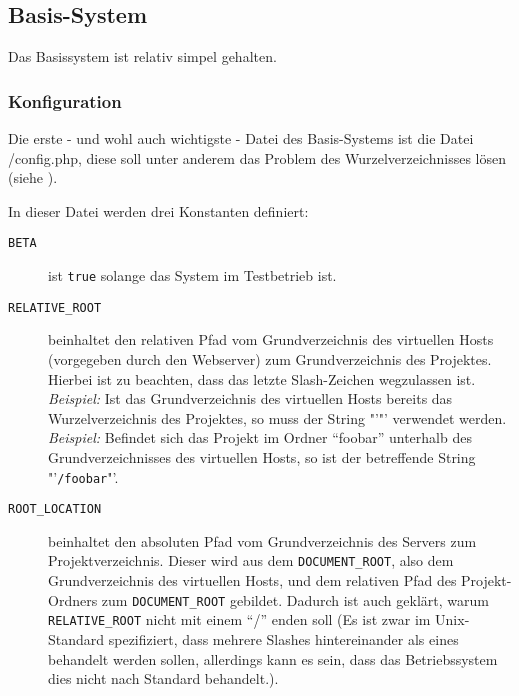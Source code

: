 \subsection{Basis-System}
Das Basissystem ist relativ simpel gehalten.\\
\subsubsection{Konfiguration}
Die erste - und wohl auch wichtigste - Datei des Basis-Systems ist die Datei /config.php, diese soll unter anderem das Problem des Wurzelverzeichnisses lösen (siehe ).

In dieser Datei werden drei Konstanten definiert:
\begin{description}
	\item[\texttt{BETA}] ist \texttt{true} solange das System im Testbetrieb ist.
	\item[\texttt{RELATIVE\_ROOT}] beinhaltet den relativen Pfad vom Grundverzeichnis des virtuellen Hosts (vorgegeben durch den Webserver) zum Grundverzeichnis des Projektes. Hierbei ist zu beachten, dass das letzte Slash-Zeichen wegzulassen ist.\\
	\textit{Beispiel:} Ist das Grundverzeichnis des virtuellen Hosts bereits das Wurzelverzeichnis des Projektes, so muss der String "'"' verwendet werden.\\
	\textit{Beispiel:} Befindet sich das Projekt im Ordner \enquote{foobar} unterhalb des Grundverzeichnisses des virtuellen Hosts, so ist der betreffende String "'\texttt{/foobar}"'.
	\item[\texttt{ROOT\_LOCATION}] beinhaltet den absoluten Pfad vom Grundverzeichnis des Servers zum Projektverzeichnis. Dieser wird aus dem \texttt{DOCUMENT\_ROOT}, also dem Grundverzeichnis des virtuellen Hosts, und dem relativen Pfad des Projekt-Ordners zum \texttt{DOCUMENT\_ROOT} gebildet. Dadurch ist auch geklärt, warum \texttt{RELATIVE\_ROOT} nicht mit einem \enquote{/} enden soll (Es ist zwar im Unix-Standard spezifiziert, dass mehrere Slashes hintereinander als eines behandelt werden sollen, allerdings kann es sein, dass das Betriebssystem dies nicht nach Standard behandelt.).
\end{description}

